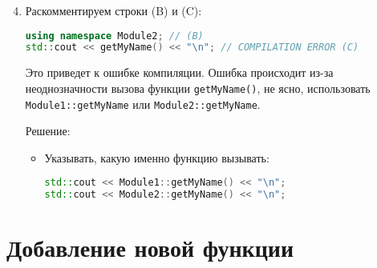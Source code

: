 \documentclass{article}
\begin{document}
\begin{enumerate}
    \setcounter{enumi}{3}
    \item Раскомментируем строки (B) и (C):
    \begin{lstlisting}[language=C++]
using namespace Module2; // (B)
std::cout << getMyName() << "\n"; // COMPILATION ERROR (C)
    \end{lstlisting}

    Это приведет к ошибке компиляции. Ошибка происходит из-за неоднозначности вызова функции \lstinline|getMyName()|, не ясно, использовать \lstinline|Module1::getMyName| или \lstinline|Module2::getMyName|.

    Решение:
    \begin{itemize}
        \item Указывать, какую именно функцию вызывать:
        \begin{lstlisting}[language=C++]
std::cout << Module1::getMyName() << "\n";
std::cout << Module2::getMyName() << "\n";
        \end{lstlisting}
    \end{itemize}
\end{enumerate}

\section*{Добавление новой функции}
\end{document}
